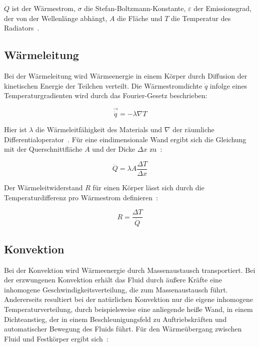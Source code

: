 $\dot{Q}$ ist der Wärmestrom, $\sigma$ die Stefan-Boltzmann-Konstante, $\varepsilon$ der Emissionsgrad, der von der Wellenlänge
abhängt, $A$ die Fläche und $T$ die Temperatur des Radiators~\cite{Wolfersdorf-2014}.

\subsection{Wärmeleitung}\label{sec:waermeleitung}

Bei der Wärmeleitung wird Wärmeenergie in einem Körper durch Diffusion der kinetischen Energie der Teilchen verteilt.
Die Wärmestromdichte $\dot{q}$ infolge eines Temperaturgradienten wird durch das Fourier-Gesetz beschrieben:

\begin{equation}
  \label{eq:fourier}
  \vec{\dot{q}} = -\lambda \nabla T
\end{equation}

Hier ist $\lambda$ die Wärmeleitfähigkeit des Materials und $\nabla$ der räumliche Differentialoperator~\cite{Weigand-2022}.
Für eine eindimensionale Wand ergibt sich die Gleichung mit der Querschnittfläche $A$ und der Dicke $\Delta x$ zu~\cite{Weigand-2022}:

\begin{equation}
  \label{eq:fourier_1d}
  \dot{Q} = \lambda A \frac{\Delta T}{\Delta x}
\end{equation}

Der Wärmeleitwiderstand $R$ für einen Körper lässt sich durch die Temperaturdifferenz pro Wärmestrom definieren~\cite{Weigand-2022}:

\begin{equation}
  \label{eq:waermewiederstand}
  R = \frac{\Delta T}{\dot{Q}}
\end{equation}

\subsection{Konvektion}\label{sec:konvektion}

Bei der Konvektion wird Wärmeenergie durch Massenaustausch transportiert. Bei der erzwungenen Konvektion erhält das Fluid durch äußere Kräfte
eine inhomogene Geschwindigkeitsverteilung, die zum Massenaustausch führt. Andererseits resultiert bei der natürlichen Konvektion nur die eigene
inhomogene Temperaturverteilung, durch beispielsweise eine anliegende heiße Wand, in einem
Dichteanstieg, der in einem Beschleunigungsfeld zu Auftriebskräften und automatischer Bewegung des Fluids führt.
Für den Wärmeübergang zwischen Fluid und Festkörper ergibt sich~\cite{Weigand-2022}:

